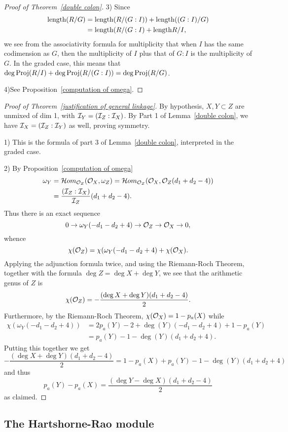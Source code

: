 \begin{proof}[Proof of Theorem~\ref{double colon}]
3) Since 
\begin{align*}
 \length (R/G) &= \length(R/(G:I))+\length((G:I)/G)\\
 &= \length(R/(G:I) +\length R/I,
\end{align*}
we see from the associativity formula for multiplicity that when $I$ has the same codimension as $G$, then the multiplicity of $I$ plus that of $G:I$ is the multiplicity of $G$. In the graded case, this means that
$\deg \Proj(R/I) +\deg \Proj(R/(G:I)) = \deg \Proj(R/G)$.

4)See Proposition~\ref{computation of omega}.
\end{proof}

 \begin{proof}[Proof of Theorem~\ref{justification of general linkage}]
 By hypothesis, 
$X,Y\subset Z$ are unmixed of dim 1, with $\cI_{Y} = (\cI_Z:\cI_X)$. By Part 1 of Lemma~\ref{double colon}, we have
$\cI_{X} = (\cI_Z:\cI_Y)$ as well, proving symmetry.

1) This is  the formula of part 3 of Lemma~\ref{double colon}, interpreted in the graded case.

2)  By Proposition~\ref{computation of omega}
\begin{align*}
 \omega_{Y} &= \cHom_{\cO_Z}(\cO_X, \omega_Z) = 
\cHom_{\cO_Z}(\cO_X, \cO_Z(d_1+d_2-4))\\
&=  \frac{(\cI_Z:\cI_X)}{\cI_{Z}}(d_1+d_2-4).
\end{align*}
Thus there is an exact sequence
$$
0\to \omega_{Y}(-d_1-d_2+4) \to \cO_Z \to \cO_X \to 0,
$$
whence
$$
 \chi(\cO_Z) =
 \chi(\omega_{Y}(-d_1-d_2+4) +
 \chi(\cO_X).
 $$
 Applying the adjunction formula twice, and using the Riemann-Roch Theorem, together with the formula
 $\deg Z = \deg X + \deg Y$, we see that the arithmetic genus of $Z$ is
 $$
 \chi(\sO_Z) = -\frac{(\deg X + \deg Y)(d_1+d_2-4)}{2}.
 $$
Furthermore, by the Riemann-Roch Theorem, $\chi(\sO_X) = 1-p_a(X)$ while
\begin{align*}
\chi(\omega_{Y}(-d_1-d_2+4)) &= 2p_a(Y) -2 + \deg(Y)(-d_1-d_2+4) + 1- p_a(Y)\\
&= p_a(Y)-1- \deg(Y)(d_1+d_2+4).
\end{align*}
Putting this together we get
$$
-\frac{(\deg X+\deg Y)(d_1+d_2-4)}{2} = 1-p_a(X) + p_a(Y)-1 - \deg(Y)(d_1+d_2+4)
$$
and thus 
$$
p_a(Y) -p_a(X) = \frac{(\deg Y-\deg X)(d_1+d_2-4)}{2}
$$
as claimed.
 \end{proof}

\subsection{The Hartshorne-Rao module}

